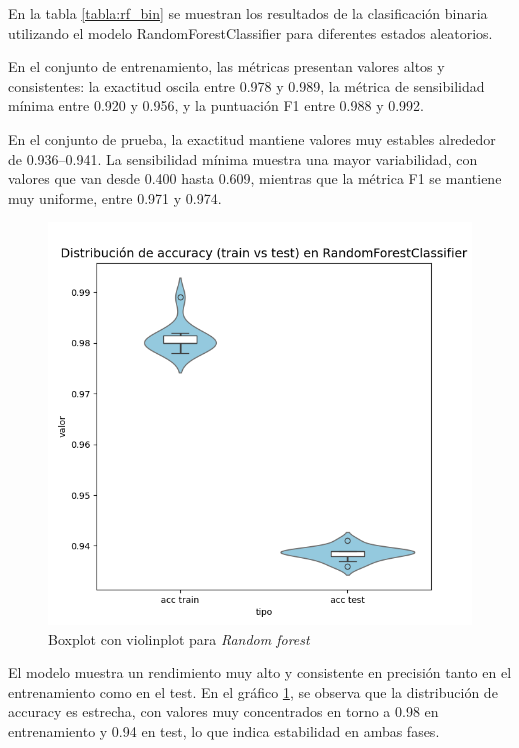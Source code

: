 En la tabla \ref{tabla:rf_bin} se muestran los resultados de la clasificación binaria utilizando el modelo RandomForestClassifier para diferentes estados aleatorios.

\vspace{1em}

En el conjunto de entrenamiento, las métricas presentan valores altos y consistentes: la exactitud oscila entre 0.978 y 0.989, la métrica de sensibilidad mínima entre 0.920 y 0.956, y la puntuación F1 entre 0.988 y 0.992.

\vspace{1em}

En el conjunto de prueba, la exactitud mantiene valores muy estables alrededor de 0.936–0.941. La sensibilidad mínima muestra una mayor variabilidad, con valores que van desde 0.400 hasta 0.609, mientras que la métrica F1 se mantiene muy uniforme, entre 0.971 y 0.974.

\begin{figure}[H]
	\centering
	\includegraphics[width=1\linewidth]{Imagenes/rf_bin}
	\caption[Boxplot con violinplot para \textit{Random forest}]{Boxplot con violinplot para \textit{Random forest}}
	\label{fig:rf_bin}
\end{figure}

El modelo muestra un rendimiento muy alto y consistente en precisión tanto en el entrenamiento como en el test. En el gráfico \ref{fig:rf_bin}, se observa que la distribución de accuracy es estrecha, con valores muy concentrados en torno a 0.98 en entrenamiento y 0.94 en test, lo que indica estabilidad en ambas fases.

